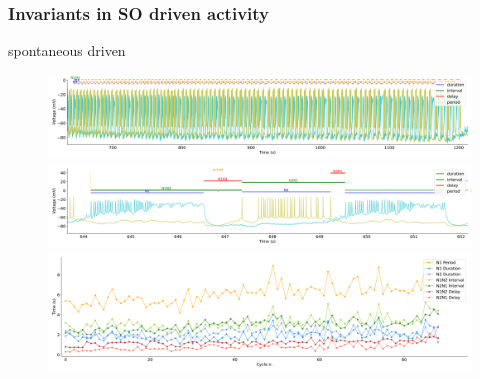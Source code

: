 \subsubsection{Invariants in SO driven activity}
\large{spontaneous driven}
 
\begin{figure}[htbp]
	\centering
	\begin{minipage}[b]{\textwidth}
		\centering
		\includegraphics[width=\textwidth,height=0.1\textheight]{./invariants/data/SUSSEX/prep4_so_driven_2/images/spontaneous_signal_intervals_zoom.pdf}
		\includegraphics[width=\textwidth]{./invariants/data/SUSSEX/prep4_so_driven_2/images/spontaneous_signal_intervals_cycle.pdf}
		\includegraphics[width=\textwidth]{./invariants/data/SUSSEX/prep4_so_driven_2/images/spontaneous_time_cycle.pdf}
	\end{minipage}
	\centering
	\begin{minipage}[b]{0.45\textwidth}
		\centering

\end{minipage}
\end{figure}
